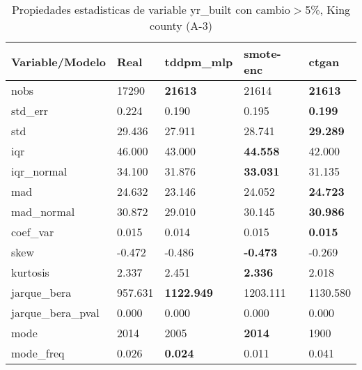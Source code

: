 \begin{table}[H]
\centering
\fontsize{8}{14}\selectfont
\caption{Propiedades estadisticas de variable yr\_built con cambio\ensuremath{>}5\%, King county (A-3)}
\label{table-stats-king county-a-3-yr_built-short}
\begin{tabular}{|l|m{10em}|m{10em}|m{10em}|m{10em}|}
\hline
 \rowcolor[gray]{0.8}
Variable/Modelo & Real & tddpm\_mlp & smote-enc & ctgan \\
\hline nobs & 17290 & \bfseries 21613 & \cellcolor[rgb]{0.9, 0.54, 0.52} 21614 & \bfseries 21613 \\
\hline std\_err & 0.224 & \cellcolor[rgb]{0.9, 0.54, 0.52} 0.190 & 0.195 & \bfseries 0.199 \\
\hline std & 29.436 & \cellcolor[rgb]{0.9, 0.54, 0.52} 27.911 & 28.741 & \bfseries 29.289 \\
\hline iqr & 46.000 & 43.000 & \bfseries 44.558 & \cellcolor[rgb]{0.9, 0.54, 0.52} 42.000 \\
\hline iqr\_normal & 34.100 & 31.876 & \bfseries 33.031 & \cellcolor[rgb]{0.9, 0.54, 0.52} 31.135 \\
\hline mad & 24.632 & \cellcolor[rgb]{0.9, 0.54, 0.52} 23.146 & 24.052 & \bfseries 24.723 \\
\hline mad\_normal & 30.872 & \cellcolor[rgb]{0.9, 0.54, 0.52} 29.010 & 30.145 & \bfseries 30.986 \\
\hline coef\_var & 0.015 & \cellcolor[rgb]{0.9, 0.54, 0.52} 0.014 & 0.015 & \bfseries 0.015 \\
\hline skew & -0.472 & -0.486 & \bfseries -0.473 & \cellcolor[rgb]{0.9, 0.54, 0.52} -0.269 \\
\hline kurtosis & 2.337 & 2.451 & \bfseries 2.336 & \cellcolor[rgb]{0.9, 0.54, 0.52} 2.018 \\
\hline jarque\_bera & 957.631 & \bfseries 1122.949 & \cellcolor[rgb]{0.9, 0.54, 0.52} 1203.111 & 1130.580 \\
\hline jarque\_bera\_pval & 0.000 & 0.000 & 0.000 & 0.000 \\
\hline mode & 2014 & 2005 & \bfseries 2014 & \cellcolor[rgb]{0.9, 0.54, 0.52} 1900 \\
\hline mode\_freq & 0.026 & \bfseries 0.024 & 0.011 & \cellcolor[rgb]{0.9, 0.54, 0.52} 0.041 \\
\hline
\end{tabular}
\end{table}
